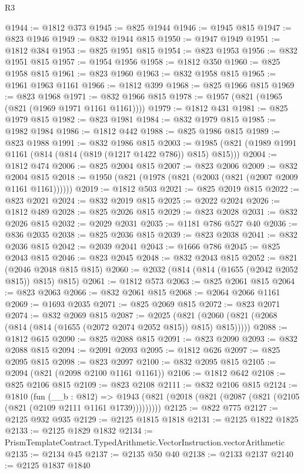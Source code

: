 \begin{lexlean}{R3}
\begin{coremodule}
@1944 := @1812 @373
@1945 := @825 @1944
@1946 := @1945 @815
@1947 := @823 @1946
@1949 := @832 @1944 @815
@1950 := @1947 @1949
@1951 := @1812 @384
@1953 := @825 @1951 @815
@1954 := @823 @1953
@1956 := @832 @1951 @815
@1957 := @1954 @1956
@1958 := @1812 @350
@1960 := @825 @1958 @815
@1961 := @823 @1960
@1963 := @832 @1958 @815
@1965 := @1961 @1963 @1161
@1966 := @1812 @399
@1968 := @825 @1966 @815
@1969 := @823 @1968
@1971 := @832 @1966 @815
@1978 := @1957 (@821 (@1965 (@821 (@1969 @1971 @1161 @1161))))
@1979 := @1812 @431
@1981 := @825 @1979 @815
@1982 := @823 @1981
@1984 := @832 @1979 @815
@1985 := @1982 @1984
@1986 := @1812 @442
@1988 := @825 @1986 @815
@1989 := @823 @1988
@1991 := @832 @1986 @815
@2003 := @1985 (@821 (@1989 @1991 @1161 (@814 (@814 (@819 (@1217 @1422 @786)) @815) @815)))
@2004 := @1812 @474
@2006 := @825 @2004 @815
@2007 := @823 @2006
@2009 := @832 @2004 @815
@2018 := @1950 (@821 (@1978 (@821 (@2003 (@821 (@2007 @2009 @1161 @1161))))))
@2019 := @1812 @503
@2021 := @825 @2019 @815
@2022 := @823 @2021
@2024 := @832 @2019 @815
@2025 := @2022 @2024
@2026 := @1812 @489
@2028 := @825 @2026 @815
@2029 := @823 @2028
@2031 := @832 @2026 @815
@2032 := @2029 @2031
@2035 := @1181 @786 @527 @40
@2036 := @836 @2035
@2038 := @825 @2036 @815
@2039 := @823 @2038
@2041 := @832 @2036 @815
@2042 := @2039 @2041
@2043 := @1666 @786
@2045 := @825 @2043 @815
@2046 := @823 @2045
@2048 := @832 @2043 @815
@2052 := @821 (@2046 @2048 @815 @815)
@2060 := @2032 (@814 (@814 (@1655 (@2042 @2052 @815)) @815) @815)
@2061 := @1812 @573
@2063 := @825 @2061 @815
@2064 := @823 @2063
@2066 := @832 @2061 @815
@2068 := @2064 @2066 @1161
@2069 := @1693 @2035
@2071 := @825 @2069 @815
@2072 := @823 @2071
@2074 := @832 @2069 @815
@2087 := @2025
    (@821 (@2060 (@821 (@2068 (@814 (@814 (@1655 (@2072 @2074 @2052 @815)) @815) @815)))))
@2088 := @1812 @615
@2090 := @825 @2088 @815
@2091 := @823 @2090
@2093 := @832 @2088 @815
@2094 := @2091 @2093
@2095 := @1812 @626
@2097 := @825 @2095 @815
@2098 := @823 @2097
@2100 := @832 @2095 @815
@2105 := @2094 (@821 (@2098 @2100 @1161 @1161))
@2106 := @1812 @642
@2108 := @825 @2106 @815
@2109 := @823 @2108
@2111 := @832 @2106 @815
@2124 := @1810
    (fun (__b : @812) =>
    @1943 (@821 (@2018 (@821 (@2087 (@821 (@2105 (@821 (@2109 @2111 @1161 @1739)))))))))
@2125 := @822 @775
@2127 := @2125 @932 @935
@2129 := @2125 @1815 @1818
@2131 := @2125 @1822 @1825
@2133 := @2125 @1829 @1832
@2134 := PrismTemplateContract.TypedArithmetic.VectorInstruction.vectorArithmetic
@2135 := @2134 @45
@2137 := @2135 @50 @40
@2138 := @2133 @2137
@2140 := @2125 @1837 @1840

\end{coremodule}
\end{lexlean}

